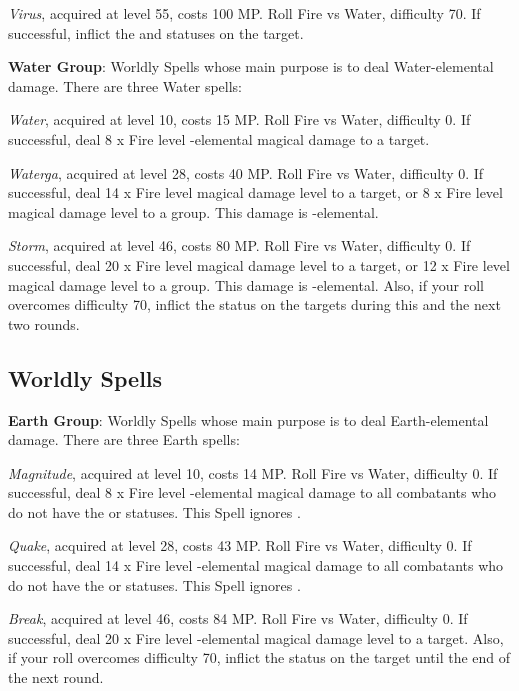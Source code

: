 \begin{multicols}{2}
    \textit{Virus}, acquired at level 55, costs 100 MP. Roll Fire vs Water, difficulty 70. If successful, inflict the  and  statuses on the target.
    
    \textbf{Water Group}: Worldly Spells whose main purpose is to deal Water-elemental damage. There are three Water spells:
    
    \textit{Water}, acquired at level 10, costs 15 MP. Roll Fire vs Water, difficulty 0. If successful, deal 8 x Fire level -elemental magical damage to a target.
    
    \textit{Waterga}, acquired at level 28, costs 40 MP. Roll Fire vs Water, difficulty 0. If successful, deal 14 x Fire level magical damage level to a target, or 8 x Fire level magical damage level to a group. This damage is -elemental.
    
    \textit{Storm}, acquired at level 46, costs 80 MP. Roll Fire vs Water, difficulty 0. If successful, deal 20 x Fire level magical damage level to a target, or 12 x Fire level magical damage level to a group. This damage is -elemental. Also, if your roll overcomes difficulty 70, inflict the  status on the targets during this and the next two rounds.
    
    \subsection{Worldly Spells}

    \textbf{Earth Group}: Worldly Spells whose main purpose is to deal Earth-elemental damage. There are three Earth spells:
    
    \textit{Magnitude}, acquired at level 10, costs 14 MP. Roll Fire vs Water, difficulty 0. If successful, deal 8 x Fire level -elemental magical damage to all combatants who do not have the  or  statuses. This Spell ignores .
    
    \textit{Quake}, acquired at level 28, costs 43 MP. Roll Fire vs Water, difficulty 0. If successful, deal 14 x Fire level -elemental magical damage to all combatants who do not have the  or  statuses. This Spell ignores .
    
    \textit{Break}, acquired at level 46, costs 84 MP. Roll Fire vs Water, difficulty 0. If successful, deal 20 x Fire level -elemental magical damage level to a target. Also, if your roll overcomes difficulty 70, inflict the  status on the target until the end of the next round.
    

\end{multicols}
